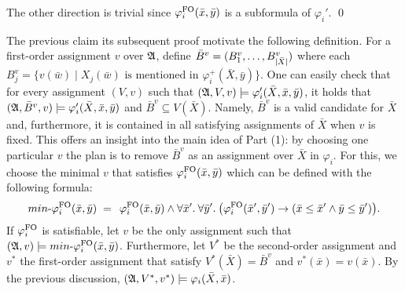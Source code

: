 The other direction is trivial since $\varphi^{{\rm FO}}_i(\bar{x},\bar{y})$ is a subformula of $\varphi_i'$.
\qed

The previous claim its subsequent proof motivate the following definition. For a first-order assignment $v$ over $\mathfrak{A}$, define $\bar{B}^v = (B^v_1,\ldots,B^v_{\vert \bar{X} \vert})$ where each $B^v_j = \{v(\bar{w}) \mid \text{$X_j(\bar{w})$ is mentioned in $\varphi^{+}_i(\bar{X},\bar{y})$}\}$.
One can easily check that for every assignment $(V, v)$ such that $(\mathfrak{A},V,v)\models \varphi_i'(\bar{X}, \bar{x}, \bar{y})$, it holds that $(\mathfrak{A},\bar{B}^v,v)\models \varphi_i'(\bar{X}, \bar{x}, \bar{y})$ and $\bar{B}^v \subseteq V(\bar{X})$.
Namely, $\bar{B}^v$ is a valid candidate for $\bar{X}$ and, furthermore, it is contained in all satisfying assignments of $\bar{X}$ when $v$ is fixed.
This offers an insight into the main idea of Part (1): by choosing one particular $v$ the plan is to remove $\bar{B}^v$ as an assignment over $\bar{X}$ in $\varphi_i$. 
For this, we choose the minimal $v$ that satisfies $\varphi^{{\rm FO}}_i(\bar{x},\bar{y})$ which can be defined with the following formula:
\[
\text{$min$-}\varphi^{{\rm FO}}_i(\bar{x}, \bar{y}) \; = \;  \,\varphi_i^{{\rm FO}}(\bar{x},\bar{y})\wedge \forall{\bar{x}'}.\: \forall{\bar{y}'}.\:\big(\varphi_i^{{\rm FO}}(\bar{x}',\bar{y}')\to ( \bar{x}\leq\bar{x}' \wedge  \bar{y}\leq\bar{y}')\big).
\] 
If $\varphi^{{\rm FO}}_i$ is satisfiable, let $v$ be the only assignment such that  $(\mathfrak{A},v)\models \text{$min$-}\varphi^{{\rm FO}}_i(\bar{x}, \bar{y})$. 
Furthermore, let $V^*$ be the second-order assignment and $v^*$ the first-order assignment that satisfy $V^*(\bar{X}) = \bar{B}^{v}$ and $v^*(\bar{x}) = v(\bar{x})$.
By the previous discussion, $(\mathfrak{A},V^*,v^*)\models\varphi_i(\bar{X},\bar{x})$.

